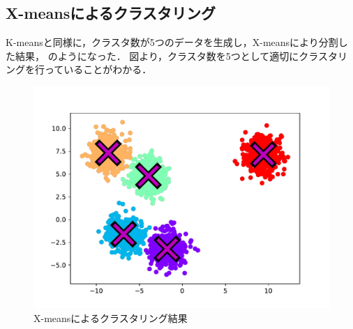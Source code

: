 \subsection{X-meansによるクラスタリング}
K-meansと同様に，クラスタ数が5つのデータを生成し，X-meansにより分割した結果，
のようになった．
図より，クラスタ数を5つとして適切にクラスタリングを行っていることがわかる．

\begin{figure}[htbp]
  \begin{center}
    \includegraphics[width=0.8\linewidth]{img/x-means/after.pdf}
    \caption{X-meansによるクラスタリング結果}
    \label{img:xmeans-after}
  \end{center}
\end{figure}
